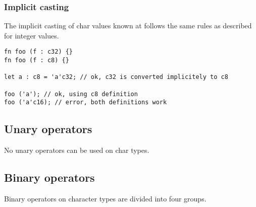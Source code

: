 \subsubsection{Implicit casting}

The implicit casting of char values known at  follows the same
rules as described for integer  values.

\begin{lstlisting}[style=coloredverbatim]
fn foo (f : c32) {}
fn foo (f : c8) {}

let a : c8 = 'a'c32; // ok, c32 is converted implicitely to c8

foo ('a'); // ok, using c8 definition
foo ('a'c16); // error, both definitions work
\end{lstlisting}

\subsection{Unary operators}
\label{sec:org78546fb}

No unary operators can be used on char types.

\subsection{Binary operators}
\label{sec:orge863f7d}

Binary operators on character types are divided into four groups.

